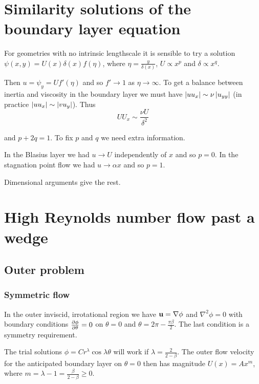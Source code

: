 \documentclass{notes}
\theoremstyle{plain}
\begin{document}
\section[Similarity solutions]%
{Similarity solutions of the boundary layer equation}

For geometries with no intrinsic lengthscale it is sensible to try a solution
$\psi(x,y) = U(x) \delta(x) f(\eta)$, where $\eta = \frac{y}{\delta(x)}$,
$U \propto x^p$ and $\delta \propto x^q$.

Then $u = \psi_y = U f'(\eta)$ and so $f' \to 1$ as $\eta \to \infty$.
To get a balance between inertia and viscosity in the boundary layer
we must have $\left|u u_x\right| \sim \nu \left|u_{yy}\right|$ (in practice
$\left|u u_x\right| \sim \left|v u_y\right|$).  Thus
\[
U U_x \sim \frac{\nu U}{\delta^2}
\]

and $p+2 q = 1$.  To fix $p$ and $q$ we need extra information.

In the Blasius layer we had $u \to U$ independently of $x$ and so
$p = 0$.  In the stagnation point flow we had $u \to \alpha x$
and so $p = 1$.

Dimensional arguments give the rest.

\section{High Reynolds number flow past a wedge}

\subsection{Outer problem}

\subsubsection*{Symmetric flow}

\vspace{1.5in}

In the outer inviscid, irrotational region we have $\mathbf{u} = \nabla \phi$
and $\nabla^2 \phi = 0$ with boundary conditions
$\frac{\partial \phi}{\partial \theta} = 0$ on $\theta = 0$ and $\theta = 2 \pi -
\frac{\pi \beta}{2}$.  The last condition is a symmetry requirement.

The trial solutions $\phi = C r^\lambda \cos \lambda \theta$ will work
if $\lambda = \frac{2}{2 - \beta}$.  The outer flow velocity for the
anticipated boundary layer on $\theta = 0$ then has magnitude
$U(x) = A x^m$, where $m = \lambda - 1 = \frac{\beta}{2 - \beta} \ge 0$.
\end{document}

